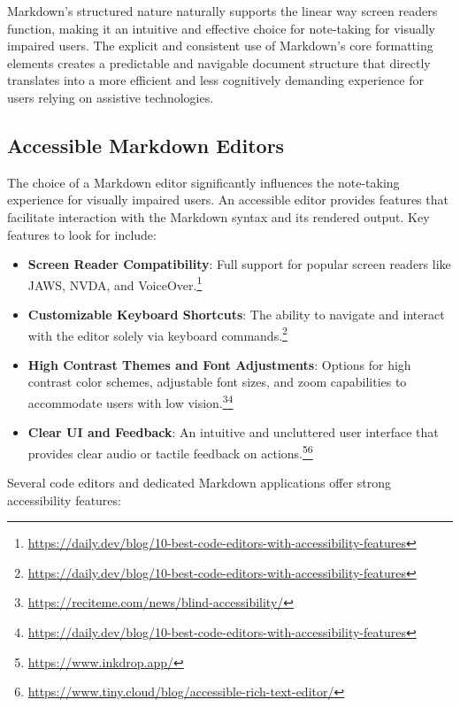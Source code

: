 Markdown's structured nature naturally supports the linear way screen readers function, making it an intuitive and effective choice for note-taking for visually impaired users. The explicit and consistent use of Markdown's core formatting elements creates a predictable and navigable document structure that directly translates into a more efficient and less cognitively demanding experience for users relying on assistive technologies.

\subsection{Accessible Markdown Editors}
The choice of a Markdown editor significantly influences the note-taking experience for visually impaired users. An accessible editor provides features that facilitate interaction with the Markdown syntax and its rendered output. Key features to look for include:
\begin{itemize}[noitemsep,topsep=0pt]
    \item \textbf{Screen Reader Compatibility}: Full support for popular screen readers like JAWS, NVDA, and VoiceOver.\footnote{\url{https://daily.dev/blog/10-best-code-editors-with-accessibility-features}}
    \item \textbf{Customizable Keyboard Shortcuts}: The ability to navigate and interact with the editor solely via keyboard commands.\footnote{\url{https://daily.dev/blog/10-best-code-editors-with-accessibility-features}}
    \item \textbf{High Contrast Themes and Font Adjustments}: Options for high contrast color schemes, adjustable font sizes, and zoom capabilities to accommodate users with low vision.\footnote{\url{https://reciteme.com/news/blind-accessibility/}}\footnote{\url{https://daily.dev/blog/10-best-code-editors-with-accessibility-features}}
    \item \textbf{Clear UI and Feedback}: An intuitive and uncluttered user interface that provides clear audio or tactile feedback on actions.\footnote{\url{https://www.inkdrop.app/}}\footnote{\url{https://www.tiny.cloud/blog/accessible-rich-text-editor/}}
\end{itemize}
Several code editors and dedicated Markdown applications offer strong accessibility features:
